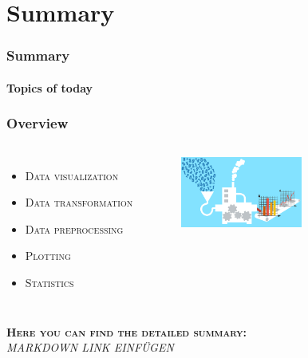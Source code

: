 \documentclass{beamer}
\begin{document}
\section{Summary}
\begin{frame}
\frametitle{Summary}
\framesubtitle{Topics of today}
\frametitle{Overview}

\begin{columns} 
    \begin{itemize}
    \item \textsc{Data visualization}
    \item \textsc{Data transformation }
    \item \textsc{Data preprocessing}
    \item \textsc{Plotting }
    \item \textsc{Statistics}
    \end{itemize} 
     \begin{figure}
    \includegraphics[width =4cm]{data_processing.jpg}
    \vspace{3cm}
    \end{figure}
    \end{columns} 
\vspace{-2cm}
\textsc{\textbf{Here you can find the detailed summary:}}\\
\textit{MARKDOWN LINK EINFÜGEN}
\end{frame}




\end{document}
